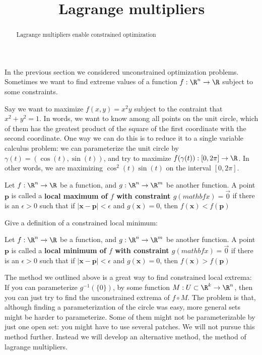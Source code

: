 \documentclass{ximera}
\title{Lagrange multipliers}
\begin{document}
	\begin{abstract}
		Lagrange multipliers enable constrained optimization
	\end{abstract}
	
	In the previous section we considered unconstrained optimization problems.  Sometimes we want to find extreme values of a function $f:\R^n \to \R$
	subject to some constraints.  
	
	\begin{example}
		Say we want to maximize $f(x,y) = x^2y$ subject to the contraint that $x^2+y^2=1$.  In  words, we want to know among all points on the unit circle,
		which of them has the greatest product of the square of the first coordinate with the second coordinate.  One way we can do this is to reduce it to a single variable
		calculus problem:  we can parameterize the unit circle by $\gamma(t) = (\cos(t),\sin(t))$, and try to maximize $f(\gamma(t)):[0,2\pi] \to \R$. In other words, we
		are maximizing $\cos^2(t)\sin(t)$ on the interval $[0,2\pi]$.
	\end{example}
	
	\begin{definition}
		Let $f:\R^n \to \R$ be a function, and $g:\R^n \to \R^m$ be another function.  A point $\mathbf{p}$ is called a \textbf{local maximum of $f$ with constraint 
		$g(mathbf{x}) = \vec{0}$} if there is an $\epsilon>0$ such that if $|\mathbf{x}-\mathbf{p}| < \epsilon$ and $g(\mathbf{x}) = 0$, 
		then $f(\mathbf{x})<f(\mathbf{p})$
	\end{definition}
	
	Give a definition of a constrained local minimum:
	
	\begin{free-response}
		Let $f:\R^n \to \R$ be a function, and $g:\R^n \to \R^m$ be another function.  A point $\mathbf{p}$ is called a \textbf{local minimum of $f$ with constraint 
		$g(mathbf{x}) = \vec{0}$} if there is an $\epsilon>0$ such that if $|\mathbf{x}-\mathbf{p}| < \epsilon$ and $g(\mathbf{x}) = 0$, 
		then $f(\mathbf{x})>f(\mathbf{p})$
	\end{free-response}
	
	The method we outlined above is a great way to find constrained local extrema: If you can parameterize $g^{-1}(\{0\})$, by some function
	 $M: U \subset \R^k \to \R^n$, 
	then you can just try to find the unconstrained extrema  of $f\circ M$.  The problem is that, although finding a parameterization of the circle was easy, more general
	sets might be harder to parameterize.  Some of them might not be parameterizable by just one open set:  you might have to use several patches.  We will not pursue
	this method further.  Instead we will develop an alternative method, the method of lagrange multipliers.
	
\end{document}
